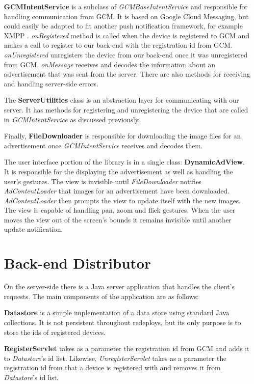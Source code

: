 \textbf{GCMIntentService} is a subclass of \textit{GCMBaseIntentService} and responsible for handling communication from GCM. It is based on Google Cloud Messaging, but could easily be adapted to fit another push notification framework, for example XMPP \cite{flores2013cloudmessaging}. \textit{onRegistered} method is called when the device is registered to GCM and makes a call to register to our back-end with the registration id from GCM. \textit{onUnregistered} unregisters the device from our back-end once it was unregistered from GCM. \textit{onMessage} receives and decodes the information about an advertisement that was sent from the server. There are also methods for receiving and handling server-side errors.

The \textbf{ServerUtilities} class is an abstraction layer for communicating with our server. It has methods for registering and unregistering the device that are called in \textit{GCMIntentService} as discussed previously.

Finally, \textbf{FileDownloader} is responsible for downloading the image files for an advertisement once \textit{GCMIntentService} receives and decodes them.

The user interface portion of the library is in a single class: \textbf{DynamicAdView}. It is responsible for the displaying the advertisement as well as handling the user's gestures. The view is invisible until \textit{FileDownloader} notifies \textit{AdContentLoader} that images for an advertisement have been downloaded. \textit{AdContentLoader} then prompts the view to update itself with the new images. The view is capable of handling pan, zoom and flick gestures. When the user moves the view out of the screen's bounds it remains invisible until another update notification.

\section{Back-end Distributor}

On the server-side there is a Java server application that handles the client's requests. The main components of the application are as follows:

\textbf{Datastore} is a simple implementation of a data store using standard Java collections. It is not persistent throughout redeploys, but its only purpose is to store the ids of registered devices.

\textbf{RegisterServlet} takes as a parameter the registration id from GCM and adds it to \textit{Datastore}'s id list. Likewise, \textit{UnregisterServlet} takes as a parameter the registration id from that a device is registered with and removes it from \textit{Datastore}'s id list.

